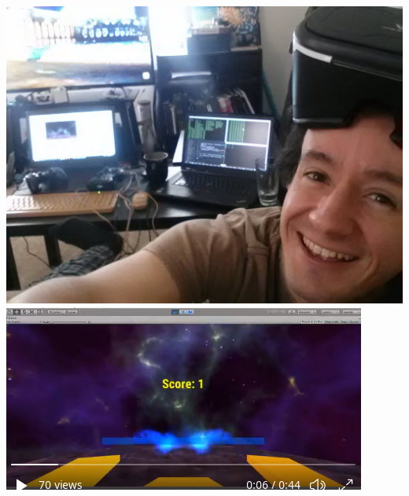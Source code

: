 \documentclass[../r.tex]{subfiles}
\begin{document}
\noindent
\includegraphics[scale=0.12]{../fun/gator_vr.jpg}
\href{https://twitter.com/randompast/status/940575416867319808}{\includegraphics[scale=0.5]{../fun/gatorvr_tinyplanet.png}}
\end{document}
